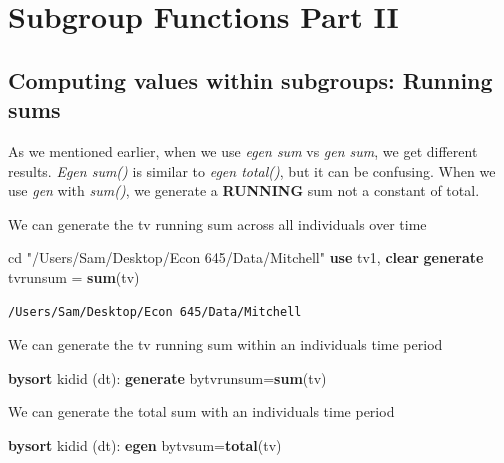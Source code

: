 \documentclass[
]{book}
\newenvironment{Shaded}{\begin{snugshade}}{\end{snugshade}}
\newcommand{\KeywordTok}[1]{\textcolor[rgb]{0.13,0.29,0.53}{\textbf{#1}}}
\newcommand{\NormalTok}[1]{#1}
\newcommand{\StringTok}[1]{\textcolor[rgb]{0.31,0.60,0.02}{#1}}
\begin{document}
\chapter{Subgroup Functions Part II}\label{subgroup-functions-part-ii}

\section{Computing values within subgroups: Running sums}\label{computing-values-within-subgroups-running-sums}

As we mentioned earlier, when we use \emph{egen sum} vs \emph{gen sum}, we get different
results. \emph{Egen sum()} is similar to \emph{egen total()}, but it can be confusing.
When we use \emph{gen} with \emph{sum()}, we generate a \textbf{RUNNING} sum not a constant of total.

We can generate the tv running sum across all individuals over time

\begin{Shaded}
\begin{Highlighting}[]
\NormalTok{cd }\StringTok{"/Users/Sam/Desktop/Econ 645/Data/Mitchell"}
\KeywordTok{use}\NormalTok{ tv1, }\KeywordTok{clear}
\KeywordTok{generate}\NormalTok{ tvrunsum = }\KeywordTok{sum}\NormalTok{(tv)}
\end{Highlighting}
\end{Shaded}

\begin{verbatim}
/Users/Sam/Desktop/Econ 645/Data/Mitchell
\end{verbatim}

We can generate the tv running sum within an individuals time period

\begin{Shaded}
\begin{Highlighting}[]
\KeywordTok{bysort}\NormalTok{ kidid (dt): }\KeywordTok{generate}\NormalTok{ bytvrunsum=}\KeywordTok{sum}\NormalTok{(tv)}
\end{Highlighting}
\end{Shaded}

We can generate the total sum with an individuals time period

\begin{Shaded}
\begin{Highlighting}[]
\KeywordTok{bysort}\NormalTok{ kidid (dt): }\KeywordTok{egen}\NormalTok{ bytvsum=}\KeywordTok{total}\NormalTok{(tv)}
\end{Highlighting}
\end{Shaded}
\end{document}

